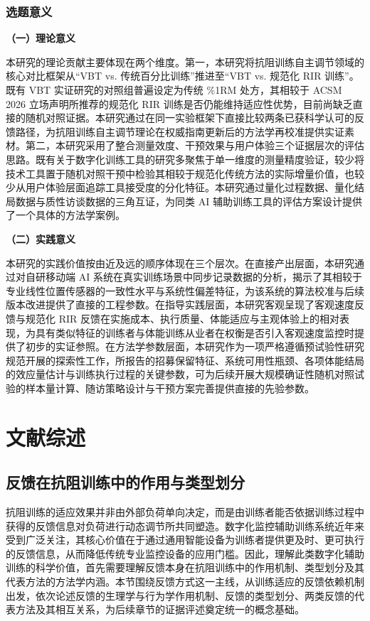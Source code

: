 \documentclass[UTF8,zihao=-4,twoside,openany]{ctexbook}
\begin{document}
\clearpage
\subsection{选题意义}

\noindent \textbf{（一）理论意义}

本研究的理论贡献主要体现在两个维度。第一，本研究将抗阻训练自主调节领域的核心对比框架从“VBT vs. 传统百分比训练”推进至“VBT vs. 规范化 RIR 训练”。既有 VBT 实证研究的对照组普遍设定为传统 \%1RM 处方，其相较于 ACSM 2026 立场声明所推荐的规范化 RIR 训练是否仍能维持适应性优势，目前尚缺乏直接的随机对照证据。本研究通过在同一实验框架下直接比较两条已获科学认可的反馈路径，为抗阻训练自主调节理论在权威指南更新后的方法学再校准提供实证素材。第二，本研究采用了整合测量效度、干预效果与用户体验三个证据层次的评估思路。既有关于数字化训练工具的研究多聚焦于单一维度的测量精度验证，较少将技术工具置于随机对照干预中检验其相较于规范化传统方法的实际增量价值，也较少从用户体验层面追踪工具接受度的分化特征。本研究通过量化过程数据、量化结局数据与质性访谈数据的三角互证，为同类 AI 辅助训练工具的评估方案设计提供了一个具体的方法学案例。

\vspace{0.4cm}
\noindent \textbf{（二）实践意义}

本研究的实践价值按由近及远的顺序体现在三个层次。在直接产出层面，本研究通过对自研移动端 AI 系统在真实训练场景中同步记录数据的分析，揭示了其相较于专业线性位置传感器的一致性水平与系统性偏差特征，为该系统的算法校准与后续版本改进提供了直接的工程参数。在指导实践层面，本研究客观呈现了客观速度反馈与规范化 RIR 反馈在实施成本、执行质量、体能适应与主观体验上的相对表现，为具有类似特征的训练者与体能训练从业者在权衡是否引入客观速度监控时提供了初步的实证参照。在方法学参数层面，本研究作为一项严格遵循预试验性研究规范开展的探索性工作，所报告的招募保留特征、系统可用性瓶颈、各项体能结局的效应量估计与训练执行过程的关键参数，可为后续开展大规模确证性随机对照试验的样本量计算、随访策略设计与干预方案完善提供直接的先验参数。

\clearpage
\chapter{文献综述}

\section{反馈在抗阻训练中的作用与类型划分}
抗阻训练的适应效果并非由外部负荷单向决定，而是由训练者能否依据训练过程中获得的反馈信息对负荷进行动态调节所共同塑造。数字化监控辅助训练系统近年来受到广泛关注，其核心价值在于通过通用智能设备为训练者提供更及时、更可执行的反馈信息，从而降低传统专业监控设备的应用门槛。因此，理解此类数字化辅助训练的科学价值，首先需要理解反馈本身在抗阻训练中的作用机制、类型划分及其代表方法的方法学内涵。本节围绕反馈方式这一主线，从训练适应的反馈依赖机制出发，依次论述反馈的生理学与行为学作用机制、反馈的类型划分、两类反馈的代表方法及其相互关系，为后续章节的证据评述奠定统一的概念基础。
\end{document}
